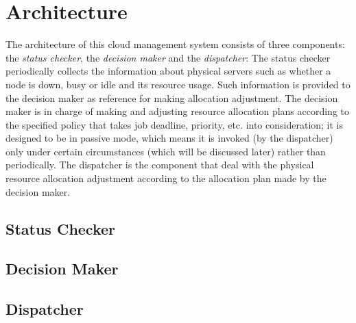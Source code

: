 \chapter{Architecture}


The architecture of this cloud management system consists of three
components: the \emph{status checker}, the \emph{decision maker} and the
\emph{dispatcher}:  The status checker periodically collects the
information about physical servers such as whether a node is down, busy
or idle and its resource usage.  Such information is provided to the
decision maker as reference for making allocation adjustment.  The
decision maker is in charge of making and adjusting resource allocation
plans according to the specified policy that takes job deadline,
priority, etc. into consideration; it is designed to be in passive mode,
which means it is invoked (by the dispatcher) only under certain
circumstances (which will be discussed later) rather than periodically.
The dispatcher is the component that deal with the physical resource
allocation adjustment according to the allocation plan made by the
decision maker.

\section{Status Checker}

\section{Decision Maker}

\section{Dispatcher}

